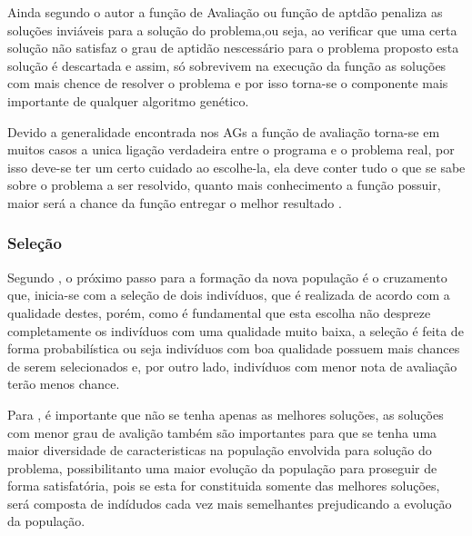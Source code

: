\par Ainda segundo o autor a função de Avaliação ou função de aptdão penaliza as
soluções inviáveis para a solução do problema,ou seja, ao verificar que uma
certa solução não satisfaz o grau de aptidão nescessário para o problema
proposto esta solução é descartada e assim, só sobrevivem na execução da função
as soluções com mais chence de resolver o problema e por isso torna-se o
componente mais importante de qualquer algoritmo genético.

\par Devido a generalidade encontrada nos AGs a função de avaliação
torna-se em muitos casos a unica ligação verdadeira entre o programa e o problema real, por
isso deve-se ter um certo cuidado ao escolhe-la, ela deve conter tudo o que se
sabe sobre o problema a ser resolvido, quanto mais conhecimento a função
possuir, maior será a chance da função entregar o melhor resultado
\cite{livro_ags_ricardo_linden}.



\subsubsection{Seleção}

\par Segundo , o próximo passo
para a formação da nova população é o cruzamento que, inicia-se com a seleção de
dois indivíduos, que é realizada de acordo com a qualidade destes, porém,
como é fundamental que esta escolha não despreze completamente os indivíduos com uma
qualidade muito baixa, a seleção é feita de forma probabilística ou seja
indivíduos com boa qualidade possuem mais chances de serem selecionados e, por outro lado,
indivíduos com menor nota de avaliação terão menos chance.

\par Para , é importante que não se tenha
apenas as melhores soluções, as soluções com menor grau de avalição também são
importantes para que se tenha uma maior diversidade de caracteristicas na
população envolvida para solução do problema, possibilitanto uma maior evolução
da população para proseguir de forma satisfatória, pois se esta for
constituida somente das melhores soluções, será composta de indídudos
cada vez mais semelhantes prejudicando a evolução da população. 

